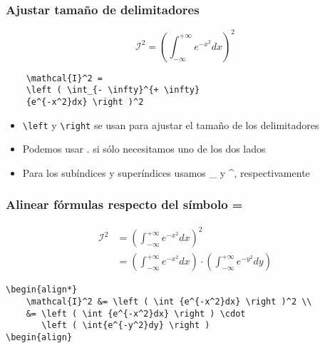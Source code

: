 \begin{frame}[fragile]
\frametitle{Ajustar tamaño de delimitadores}
    \begin{center}
    \begin{equation*}
    \mathcal{I}^2 = \left ( \int_{- \infty}^{+ \infty}{e^{-x^2}dx} \right )^2
    \end{equation*}
    \begin{verbatim}
    \mathcal{I}^2 =
    \left ( \int_{- \infty}^{+ \infty}
    {e^{-x^2}dx} \right )^2
    \end{verbatim}
    \end{center}
    \begin{itemize}
        \item{\verb|\left| y \verb|\right| se usan para ajustar el tamaño de los delimitadores} 
        \item{Podemos usar . si sólo necesitamos uno de los dos lados}
        \item{Para los subíndices y superíndices usamos \_ y \^{}, respectivamente}
    \end{itemize}
\end{frame}


\begin{frame}[fragile]
\frametitle{Alinear fórmulas respecto del símbolo =}

\begin{align*}
    \mathcal{I}^2 &= \left ( \int_{- \infty}^{+ \infty}{e^{-x^2}dx} \right )^2 \\
    &= \left ( \int_{- \infty}^{+ \infty}{e^{-x^2}dx} \right ) \cdot \left ( \int_{- \infty}^{+ \infty}{e^{-y^2}dy} \right )
\end{align*}

\begin{verbatim}
\begin{align*}
    \mathcal{I}^2 &= \left ( \int {e^{-x^2}dx} \right )^2 \\
    &= \left ( \int {e^{-x^2}dx} \right ) \cdot
       \left ( \int{e^{-y^2}dy} \right )
\begin{align}
\end{verbatim}
\end{frame}

